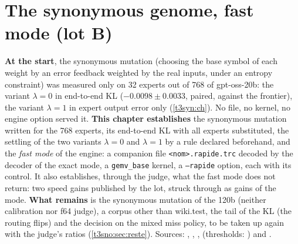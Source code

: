 
\chapter{The synonymous genome, fast mode (lot B)}\label{t3sno:ch}

\begin{origine}
\textbf{At the start}, the synonymous mutation (choosing the base symbol of each weight by an error feedback weighted by the real inputs, under an entropy constraint) was measured only on \num{32} experts out of \num{768} of gpt-oss-20b: the variant $\lambda = 0$ in end-to-end KL ($-\num{0.0098} \pm \num{0.0033}$, paired, against the frontier), the variant $\lambda = 1$ in expert output error only (\cref{t3syn:ch}). No file, no kernel, no engine option served it.
\textbf{This chapter establishes} the synonymous mutation written for the \num{768} experts, its end-to-end KL with all experts substituted, the settling of the two variants $\lambda = 0$ and $\lambda = 1$ by a rule declared beforehand, and the \emph{fast mode} of the engine: a companion file \texttt{<nom>.rapide.trc} decoded by the decoder of the exact mode, a \texttt{gemv\_base} kernel, a \texttt{--rapide} option, each with its control. It also establishes, through the judge, what the fast mode does not return: two speed gains published by the lot, struck through as gains of the mode.
\textbf{What remains} is the synonymous mutation of the 120b (neither calibration nor f64 judge), a corpus other than wiki.test, the tail of the KL (the routing flips) and the decision on the mixed miss policy, to be taken up again with the judge's ratios (\cref{t3sno:sec:reste}).
Sources: , , ,  (thresholds: ) and .
\end{origine}

